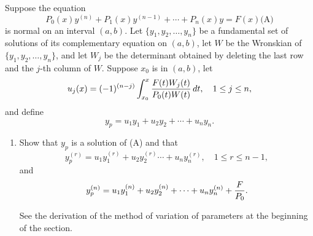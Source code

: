\documentclass{ximera}
\begin{document}
\begin{problem}\label{exer:9.4.34}
Suppose the equation
$$
P_0(x)y^{(n)}+P_1(x)y^{(n-1)}+\cdots+P_n(x)y=F(x)
\text{(A)}
$$
is normal on an interval $(a,b)$. Let $\{y_1,y_2,\dots,y_n\}$ be a
fundamental set of solutions of its complementary equation on $(a,b)$,
let $W$ be the Wronskian of $\{y_1,y_2,\dots,y_n\}$, and let $W_j$ be
the determinant obtained by deleting the last row and the $j$-th
column of $W$. Suppose $x_0$ is in $(a,b)$, let
$$
u_j(x)=(-1)^{(n-j)}\int_{x_0}^x{F(t)W_j(t)\over P_0(t)W(t)}\,dt,
\quad 1\le j\le n,
$$
and define
$$
y_p=u_1y_1+u_2y_2+\cdots+u_ny_n.
$$
\begin{enumerate}
\item %
Show that $y_p$ is a solution of (A) and that
$$
y_p^{(r)}=u_1y^{(r)}_1+u_2y_2^{(r)}\cdots+u_ny^{(r)}_n,\quad 1
\le r \le n-1,
$$
and
$$
y_p^{(n)}=u_1y_1^{(n)}+u_2y_2^{(n)}+\cdots+u_ny_n^{(n)}+{F\over P_0}.
$$
\begin{hint}
See the derivation of the method of variation of
parameters at the beginning of the section.
\end{hint}


\end{enumerate}
\end{problem}
\end{document}
